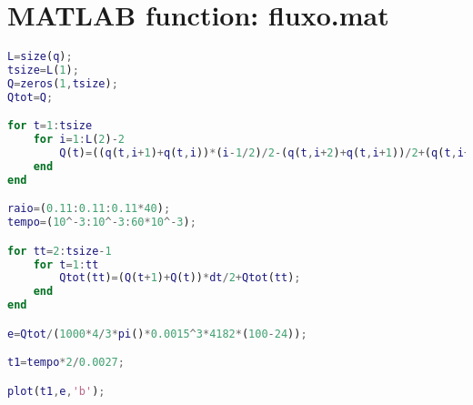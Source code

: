 \chapter{MATLAB function: fluxo.mat}
\label{ap:d}
\begin{lstlisting}[language=matlab]
% Initialization (variables from fluxo.mat)
L=size(q);
tsize=L(1);
Q=zeros(1,tsize);
Qtot=Q;

for t=1:tsize
    for i=1:L(2)-2
        Q(t)=((q(t,i+1)+q(t,i))*(i-1/2)/2-(q(t,i+2)+q(t,i+1))/2+(q(t,i+1)+q(t,i))/2)*dx^2*2*pi()+Q(t);
    end
end

raio=(0.11:0.11:0.11*40);
tempo=(10^-3:10^-3:60*10^-3);

for tt=2:tsize-1
    for t=1:tt
        Qtot(tt)=(Q(t+1)+Q(t))*dt/2+Qtot(tt);
    end
end

e=Qtot/(1000*4/3*pi()*0.0015^3*4182*(100-24));

t1=tempo*2/0.0027;

plot(t1,e,'b');
\end{lstlisting}
